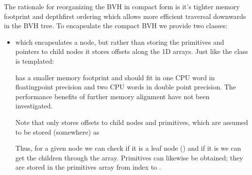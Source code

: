 \documentclass[letterpaper,10pt,english]{sphinxmanual}
\begin{document}
\sphinxAtStartPar
The rationale for reorganizing the BVH in compact form is it’s tighter memory footprint and depth\sphinxhyphen{}first ordering which allows more efficient traversal downwards in the BVH tree.
To encapsulate the compact BVH we provide two classes:
\begin{itemize}
\item {} 
\sphinxAtStartPar
{} which encapsulates a node, but rather than storing the primitives and pointers to child nodes it stores offsets along the 1D arrays.
Just like  the class is templated:

\begin{sphinxVerbatim}[commandchars=\\\{\}]
        
 
\end{sphinxVerbatim}

\sphinxAtStartPar
{} has a smaller memory footprint and should fit in one CPU word in floating\sphinxhyphen{}point precision and two CPU words in double point precision.
The performance benefits of further memory alignment have not been investigated.

\sphinxAtStartPar
Note that  only stores offsets to child nodes and primitives, which are assumed to be stored (somewhere) as

\begin{sphinxVerbatim}[commandchars=\\\{\}]
      
   
\end{sphinxVerbatim}

\sphinxAtStartPar
Thus, for a given node we can check if it is a leaf node () and if it is we can get the children through the  array.
Primitives can likewise be obtained; they are stored in the primitives array from index  to .


\end{itemize}
\end{document}
